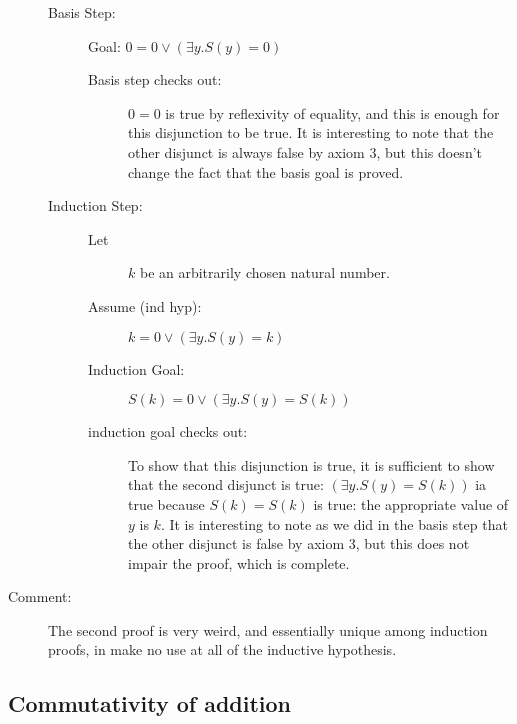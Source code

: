 \documentclass[12pt]{article}
\begin{document}
\begin{description}
\begin{description}

\item[Basis Step:]  Goal:  $0=0 \vee (\exists y.S(y)=0)$

\begin{description}

\item[Basis step checks out:] $0=0$ is true by reflexivity of
equality, and this is enough for this disjunction to be true.  It is
interesting to note that the other disjunct is always false by axiom
3, but this doesn't change the fact that the basis goal is proved.

\end{description}

\item[Induction Step:]

\begin{description}

\item[Let]  $k$ be an arbitrarily chosen natural number.

\item[Assume (ind hyp):]  $k=0 \vee (\exists y.S(y)=k)$

\item[Induction Goal:]  $S(k)=0 \vee (\exists y.S(y)=S(k))$

\item[induction goal checks out:] To show that this disjunction is
true, it is sufficient to show that the second disjunct is true:
$(\exists y.S(y)=S(k))$ ia true because $S(k)=S(k)$ is true: the
appropriate value of $y$ is $k$.  It is interesting to note as we did
in the basis step that the other disjunct is false by axiom 3, but
this does not impair the proof, which is complete.

\end{description}

\end{description}

\item[Comment:] The second proof is very weird, and essentially unique
among induction proofs, in make no use at all of the inductive
hypothesis.

\end{description}

\subsection{Commutativity of addition}
\end{document}
